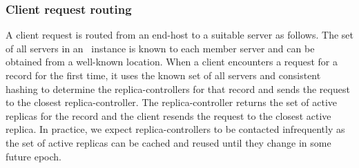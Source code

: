 \subsubsection{Client request routing}
\label{sec:routing_client_requests}
A client request is routed from an end-host to a suitable server as follows. 
The set of all servers in an \auspice\ instance is known to each member server and can be obtained from a well-known location. 
When a client encounters a request for a record for the first time, it uses the known set of all servers and consistent hashing to determine the replica-controllers for that record and sends the request to the closest replica-controller. The replica-controller returns the set of active replicas for the record and the client resends the request to the closest active replica.  In practice, we expect replica-controllers to be contacted infrequently as the set of active replicas can be cached and reused until they change in some future epoch. %










